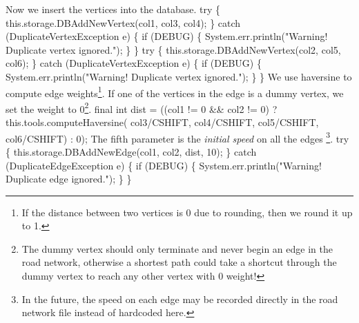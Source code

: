 \nwdocspar
{\small Now we insert the vertices into the database.}
\nwenddocs{}\plusendmoddef
try \{
  this.storage.DBAddNewVertex(col1, col3, col4);
\} catch (DuplicateVertexException e) \{
  if (DEBUG) \{
    System.err.println("Warning! Duplicate vertex ignored.");
  \}
\}
try \{
  this.storage.DBAddNewVertex(col2, col5, col6);
\} catch (DuplicateVertexException e) \{
  if (DEBUG) \{
    System.err.println("Warning! Duplicate vertex ignored.");
  \}
\}
\nwendcode{}\nwdocspar
{\small We use haversine to compute edge weights\footnote{If the distance between two
vertices is 0 due to rounding, then we round it up to 1.}.  If one of the
vertices in the edge is a dummy vertex, we set the weight to 0\footnote{The
dummy vertex should only terminate and never begin an edge in the road network,
otherwise a shortest path could take a shortcut through the dummy vertex to
reach any other vertex with 0 weight!}.}
\nwenddocs{}\plusendmoddef
final int dist = ((col1 != 0 && col2 != 0)
  ? this.tools.computeHaversine(
        col3/CSHIFT, col4/CSHIFT,
        col5/CSHIFT, col6/CSHIFT) : 0);
\nwendcode{}\nwdocspar
{\small The fifth parameter is the \textit{initial speed} on all the edges
\footnote{In the future, the speed on each edge may be recorded directly in the
road network file instead of hardcoded here.}.}
\nwenddocs{}\plusendmoddef
try \{
  this.storage.DBAddNewEdge(col1, col2, dist, 10);
\} catch (DuplicateEdgeException e) \{
  if (DEBUG) \{
    System.err.println("Warning! Duplicate edge ignored.");
  \}
\}
\nwendcode{}\nwdocspar

